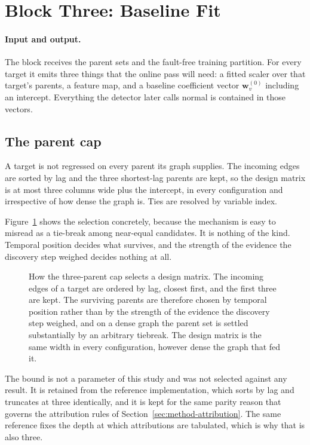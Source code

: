 \section{Block Three: Baseline Fit}
\label{sec:method-baseline}

\paragraph{Input and output.} The block receives the parent sets and the fault-free training partition. For every target it emits three things that the online pass will need: a fitted scaler over that target's parents, a feature map, and a baseline coefficient vector $\mathbf{w}^{(0)}_v$ including an intercept. Everything the detector later calls normal is contained in those vectors.

\subsection{The parent cap}
\label{sec:parent-cap}

A target is not regressed on every parent its graph supplies. The incoming edges are sorted by lag and the three shortest-lag parents are kept, so the design matrix is at most three columns wide plus the intercept, in every configuration and irrespective of how dense the graph is. Ties are resolved by variable index.

Figure~\ref{fig:parentcap-diagram} shows the selection concretely, because the mechanism is easy to misread as a tie-break among near-equal candidates. It is nothing of the kind. Temporal position decides what survives, and the strength of the evidence the discovery step weighed decides nothing at all.

\begin{figure}[htbp]
  \centering
  \resizebox{0.92\textwidth}{!}{}
  \caption[How the three-parent cap selects a design matrix]{How the three-parent cap selects a design matrix. The incoming edges of a target are ordered by lag, closest first, and the first three are kept. The surviving parents are therefore chosen by temporal position rather than by the strength of the evidence the discovery step weighed, and on a dense graph the parent set is settled substantially by an arbitrary tiebreak. The design matrix is the same width in every configuration, however dense the graph that fed it.}
  \label{fig:parentcap-diagram}
\end{figure}

The bound is not a parameter of this study and was not selected against any result. It is retained from the reference implementation, which sorts by lag and truncates at three identically, and it is kept for the same parity reason that governs the attribution rules of Section~\ref{sec:method-attribution}. The same reference fixes the depth at which attributions are tabulated, which is why that is also three.

